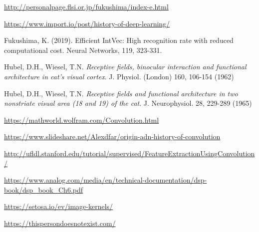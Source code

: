 \begin{thebibliography}{}
 \url{http://personalpage.flsi.or.jp/fukushima/index-e.html}

 \url{https://www.import.io/post/history-of-deep-learning/}

 Fukushima, K. (2019). Efficient IntVec: High recognition rate with reduced computational cost. Neural Networks, 119, 323-331.

 Hubel, D.H., Wiesel, T.N. \textit{Receptive fields, binocular interaction
and functional architecture in cat's visual cortex}. J. Physiol.
(London) 160, 106-154 (1962)

 Hubel, D.H., Wiesel, T.N. \textit{Receptive fields and functional architecture in two nonstriate visual area (18 and 19) of the cat}. J.
Neurophysiol. 28, 229-289 (1965)

 \url{https://mathworld.wolfram.com/Convolution.html}

 \url{https://www.slideshare.net/Alexdfar/origin-adn-history-of-convolution}

 \url{http://ufldl.stanford.edu/tutorial/supervised/FeatureExtractionUsingConvolution/}

 \url{https://www.analog.com/media/en/technical-documentation/dsp-book/dsp_book_Ch6.pdf}

 \url{https://setosa.io/ev/image-kernels/}





 \url{https://thispersondoesnotexist.com/}















\end{thebibliography}
